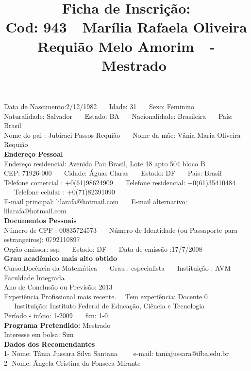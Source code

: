 \documentclass[11pt]{article}
\title{\vspace*{-4cm} Ficha de Inscrição: \\Cod: 943\ \ Marília Rafaela  Oliveira Requião Melo Amorim\ \ - \ \ Mestrado 
 }
\date{}
\begin{document}
\maketitle
\vspace*{-1.5cm}
\noindent Data de Nascimento:2/12/1982
\ \ \ Idade: 31   \ \ \ Sexo: Feminino
\\
Naturalidade: Salvador  
\ \ \  Estado: BA
\ \ \  Nacionalidade: Brasileira
\ \ \ País: Brasil
\\        
Nome do pai : Jubiraci Passos Requião
\ \ \ Nome da mãe: Vânia Maria Oliveira Requião          
\\[0.2cm]                     
\textbf{Endereço Pessoal} 
\\ 
\noindent Endereço residencial: Avenida Pau Brasil, Lote 18 apto 504 bloco B
\\
        CEP: 71926-000 
\ \ \ Cidade: Águas Claras 
\ \ \ Estado: DF 
\ \ \ País: Brasil
\\		
		Telefone comercial : +0(61)98624909
\ \ \ Telefone residencial: +0(61)35410484
\ \ \ Telefone celular : +0(71)82391090
\\
E-mail principal: lilarafa@hotmail.com
\ \ \ E-mail alternativo: lilarafa@hotmail.com 
\\[0.2cm] 
\textbf{Documentos Pessoais}
\\
\noindent Número de CPF : 00835724573
\ \ \ Número de Identidade (ou Passaporte para estrangeiros): 0792110897
\\
Orgão emissor: ssp
\ \ \ Estado: DF
\ \ \ Data de emissão :17/7/2008
\\[0.3cm]
\textbf{Grau acadêmico mais alto obtido}
\\	
Curso:Docência da Matemática
\ \ \ Grau : especialista
\ \ \ Instituição : AVM Faculdade Integrada
\\			
Ano de Conclusão ou Previsão: 2013
\\ 
Experiência Profissional mais recente. \ \  
Tem experiência: Docente 0  
\ \ \ Instituição: Instituto Federal de Educação, Ciência e Tecnologia
\\  
Período - início: 1-2009
\ \ \ fim: 1-0
\\[0.2cm] 
\textbf{Programa Pretendido:} Mestrado\\
Interesse em bolsa: Sim
\\[0.3cm]		
\textbf{Dados dos Recomendantes} 
\\
1- Nome: Tânia Jussara Silva Santana
\ \ \ \  e-mail: taniajussara@ifba.edu.br 
\\
2- Nome: Ângela Cristina da Fonseca Mirante
\end{document}
